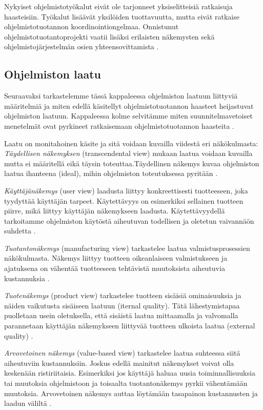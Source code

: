 \documentclass[finnish]{tktltiki2}
\theoremstyle{definition}
\theoremstyle{remark}
\begin{document}
Nykyiset ohjelmistotyökalut eivät ole tarjonneet yksiselitteisiä ratkaisuja haasteisiin. Työkalut lisäävät yksilöiden tuottavuutta, mutta eivät ratkaise ohjelmistotuotannon koordinointiongelmaa. Onnistunut ohjelmistotuotantoprojekti vaatii lisäksi erilaisten näkemysten sekä ohjelmistojärjestelmän osien yhteensovittamista \cite{KES95}.

\subsection{Ohjelmiston laatu}

Seuraavaksi tarkastelemme tässä kappaleessa ohjelmiston laatuun liittyviä määritelmiä ja miten edellä käsitellyt ohjelmistotuotannon haasteet heijastuvat ohjelmiston laatuun. Kappaleessa kolme selvitämme miten suunnitelmavetoiset menetelmät ovat pyrkineet ratkaisemaan ohjelmistotuotannon haasteita \cite{KIP96}.

Laatu on monitahoinen käsite ja sitä voidaan kuvailla viidestä eri näkökulmasta: \textit{Täydellisen näkemyksen} (transcendental view) mukaan laatua voidaan kuvailla mutta ei määritellä eikä täysin toteuttaa.Täydellinen näkemys kuvaa ohjelmiston laatua ihanteena (ideal), mihin ohjelmiston toteutuksessa pyritään \cite{KIP96}. 

\textit{ Käyttäjänäkemys} (user view) laadusta liittyy konkreettisesti tuotteeseen, joka tyydyttää käyttäjän tarpeet. Käytettävyys on esimerkiksi sellainen tuotteen piirre, mikä liittyy käyttäjän näkemykseen laadusta. Käytettävyydellä tarkoitamme ohjelmiston käytöstä aiheutuvan todellisen ja oletetun vaivannäön suhdetta \cite{KIP96}.  

\textit{Tuotantonäkemys} (manufacturing view) tarkastelee laatua valmistusprosessien näkökulmasta. Näkemys liittyy tuotteen oikeanlaiseen valmistukseen ja ajatuksena on vähentää tuotteeseen tehtävistä muutoksista aiheutuvia kustannuksia \cite{KIP96}. 

 \textit {Tuotenäkemys} (product view) tarkastelee tuotteen sisäisiä ominaisuuksia ja näiden vaikutusta sisäiseen laatuun (iternal quality). Tätä lähestymistapaa puolletaan usein oletuksella, että sisäistä laatua mittaamalla ja valvomalla parannetaan käyttäjän näkemykseen liittyvää tuotteen ulkoista laatua (external quality) \cite{KIP96}.  

 \textit{Arvovetoinen näkemys} (value-based view) tarkastelee laatua suhteessa siitä aiheutuviin kustannuksiin. Joskus edellä mainitut näkemykset voivat olla keskenään ristiriitaisia. Esimerkiksi jos käyttäjä haluaa uusia toiminnallisuuksia tai muutoksia ohjelmistoon ja toisaalta tuotantonäkemys pyrkii vähentämään muutoksia. Arvovetoinen näkemys auttaa löytämään tasapainon kustannusten ja laadun väliltä \cite{KIP96}.
\end{document}
